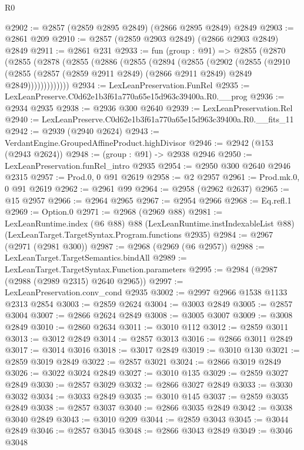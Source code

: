 \begin{lexlean}{R0}
\begin{coremodule}
@2902 := @2857 (@2859 @2895 @2849) (@2866 @2895 @2849) @2849
@2903 := @2861 @209
@2910 := @2857 (@2859 @2903 @2849) (@2866 @2903 @2849) @2849
@2911 := @2861 @231
@2933 := fun (group : @91) =>
  @2855
    (@2870
      (@2855
        (@2878
          (@2855
            (@2886
              (@2855
                (@2894
                  (@2855
                    (@2902
                      (@2855
                        (@2910
                          (@2855
                            (@2857 (@2859 @2911 @2849) (@2866 @2911 @2849) @2849 @2849)))))))))))))
@2934 := LexLeanPreservation.FunRel
@2935 := LexLeanPreserve.C0d62e1b3f61a770a65e15d963c39400a.R0.__prog
@2936 := @2934 @2935
@2938 := @2936 @300 @2640
@2939 := LexLeanPreservation.Rel
@2940 := LexLeanPreserve.C0d62e1b3f61a770a65e15d963c39400a.R0.__fits_11
@2942 := @2939 (@2940 @2624)
@2943 := VerdantEngine.GroupedAffineProduct.highDivisor
@2946 := @2942 (@153 (@2943 @2624))
@2948 := (group : @91) -> @2938 @2946
@2950 := LexLeanPreservation.funRel_intro @2935
@2954 := @2950 @300 @2640 @2946 @2315
@2957 := Prod.{0, 0} @91 @2619
@2958 := @2 @2957
@2961 := Prod.mk.{0, 0} @91 @2619
@2962 := @2961 @99
@2964 := @2958 (@2962 @2637)
@2965 := @15 @2957
@2966 := @2964 @2965
@2967 := @2954 @2966
@2968 := Eq.refl.{1}
@2969 := Option.{0}
@2971 := @2968 (@2969 @88)
@2981 := LexLeanRuntime.index
    (@6 @88)
    @88
    (LexLeanRuntime.instIndexableList @88)
    (LexLeanTarget.TargetSyntax.Program.functions @2935)
@2984 := @2967 (@2971 (@2981 @300))
@2987 := @2968 (@2969 (@6 @2957))
@2988 := LexLeanTarget.TargetSemantics.bindAll
@2989 := LexLeanTarget.TargetSyntax.Function.parameters
@2995 := @2984 (@2987 (@2988 (@2989 @2315) @2640 @2965))
@2997 := LexLeanPreservation.conv_cond @2935
@3002 := @2997 @2966 @1538 @1133 @2313 @2854
@3003 := @2859 @2624
@3004 := @3003 @2849
@3005 := @2857 @3004
@3007 := @2866 @2624 @2849
@3008 := @3005 @3007
@3009 := @3008 @2849
@3010 := @2860 @2634
@3011 := @3010 @112
@3012 := @2859 @3011
@3013 := @3012 @2849
@3014 := @2857 @3013
@3016 := @2866 @3011 @2849
@3017 := @3014 @3016
@3018 := @3017 @2849
@3019 := @3010 @130
@3021 := @2859 @3019 @2849
@3022 := @2857 @3021
@3024 := @2866 @3019 @2849
@3026 := @3022 @3024 @2849
@3027 := @3010 @135
@3029 := @2859 @3027 @2849
@3030 := @2857 @3029
@3032 := @2866 @3027 @2849
@3033 := @3030 @3032
@3034 := @3033 @2849
@3035 := @3010 @145
@3037 := @2859 @3035 @2849
@3038 := @2857 @3037
@3040 := @2866 @3035 @2849
@3042 := @3038 @3040 @2849
@3043 := @3010 @209
@3044 := @2859 @3043
@3045 := @3044 @2849
@3046 := @2857 @3045
@3048 := @2866 @3043 @2849
@3049 := @3046 @3048

\end{coremodule}
\end{lexlean}
